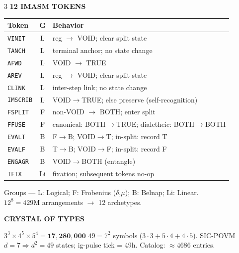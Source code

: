 \documentclass[7pt]{article}
\newcommand{\shead}[1]{%
  \vspace{2pt}%
  {\fontsize{6pt}{6.5pt}\selectfont\sffamily\bfseries\textcolor{hd}{\MakeUppercase{#1}}}%
  \vspace{0.3pt}\newline{\color{rl}\hrule height 0.2pt}\vspace{1pt}%
}
\newcommand{\tok}[1]{{\fontsize{8.5pt}{9.5pt}\selectfont\fontseries{b}\selectfont\texttt{#1}}}
\begin{document}
\begin{multicols}{3}
\vspace{1pt}
\shead{12 IMASM Tokens}

{\fontsize{6.5pt}{7.8pt}\selectfont
\begin{tabular}{@{}l@{\;}c@{\;}p{54mm}@{}}
\toprule
\textbf{Token} & \textbf{G} & \textbf{Behavior} \\
\midrule
\tok{VINIT}   & L & reg $\to$ VOID; clear split state \\
\tok{TANCH}   & L & terminal anchor; no state change \\
\tok{AFWD}    & L & VOID $\to$ TRUE \\
\tok{AREV}    & L & reg $\to$ VOID; clear split state \\
\tok{CLINK}   & L & inter-step link; no state change \\
\tok{IMSCRIB} & L & VOID$\to$TRUE; else preserve (self-recognition) \\
\tok{FSPLIT}  & F & non-VOID $\to$ BOTH; enter split \\
\tok{FFUSE}   & F & canonical: BOTH$\to$TRUE;\; dialetheic: BOTH$\to$BOTH \\
\tok{EVALT}   & B & F$\to$B; VOID$\to$T; in-split: record T \\
\tok{EVALF}   & B & T$\to$B; VOID$\to$F; in-split: record F \\
\tok{ENGAGR}  & B & VOID$\to$BOTH (entangle) \\
\tok{IFIX}    & Li & fixation; subsequent tokens no-op \\
\bottomrule
\end{tabular}

Groups — L: Logical;\; F: Frobenius ($\delta$,$\mu$);\; B: Belnap;\; Li: Linear.\\
$12^8 = 429\text{M}$ arrangements $\to$ 12 archetypes.
}

\columnbreak

\shead{Crystal of Types}
$3^3 \times 4^5 \times 5^4 = \mathbf{17{,}280{,}000}$\quad
$49=7^2$ symbols ($3\cdot 3+5\cdot 4+4\cdot 5$).
SIC-POVM $d=7 \Rightarrow d^2=49$ states; ig-pulse tick = 49h.
Catalog: ${\approx}4686$ entries.


\end{multicols}
\end{document}
